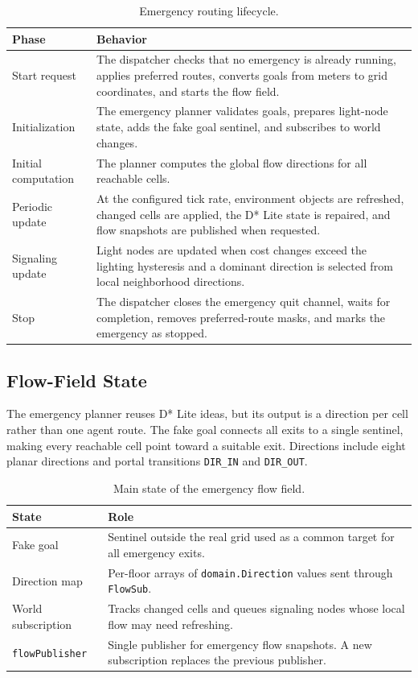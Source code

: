 \documentclass[12pt,a4paper]{report}
\begin{document}
\begin{table}[H]
\centering
\begin{tabular}{|p{}|p{}|}
\hline
\textbf{Phase} & \textbf{Behavior} \\
\hline
Start request &
The dispatcher checks that no emergency is already running, applies preferred
routes, converts goals from meters to grid coordinates, and starts the flow
field. \\
\hline
Initialization &
The emergency planner validates goals, prepares light-node state, adds the fake
goal sentinel, and subscribes to world changes. \\
\hline
Initial computation &
The planner computes the global flow directions for all reachable cells. \\
\hline
Periodic update &
At the configured tick rate, environment objects are refreshed, changed cells
are applied, the D* Lite state is repaired, and flow snapshots are published
when requested. \\
\hline
Signaling update &
Light nodes are updated when cost changes exceed the lighting hysteresis and a
dominant direction is selected from local neighborhood directions. \\
\hline
Stop &
The dispatcher closes the emergency quit channel, waits for completion, removes
preferred-route masks, and marks the emergency as stopped. \\
\hline
\end{tabular}
\caption{Emergency routing lifecycle.}
\end{table}

\subsection{Flow-Field State}

The emergency planner reuses D* Lite ideas, but its output is a direction per
cell rather than one agent route. The fake goal connects all exits to a single
sentinel, making every reachable cell point toward a suitable exit. Directions
include eight planar directions and portal transitions \texttt{DIR\_IN} and
\texttt{DIR\_OUT}.

\begin{table}[H]
\centering
\begin{tabular}{|p{}|p{}|}
\hline
\textbf{State} & \textbf{Role} \\
\hline
Fake goal &
Sentinel outside the real grid used as a common target for all emergency exits. \\
\hline
Direction map &
Per-floor arrays of \texttt{domain.Direction} values sent through
\texttt{FlowSub}. \\
\hline
World subscription &
Tracks changed cells and queues signaling nodes whose local flow may need
refreshing. \\
\hline
\texttt{flowPublisher} &
Single publisher for emergency flow snapshots. A new subscription replaces the
previous publisher. \\
\hline
\end{tabular}
\caption{Main state of the emergency flow field.}
\end{table}
\end{document}
